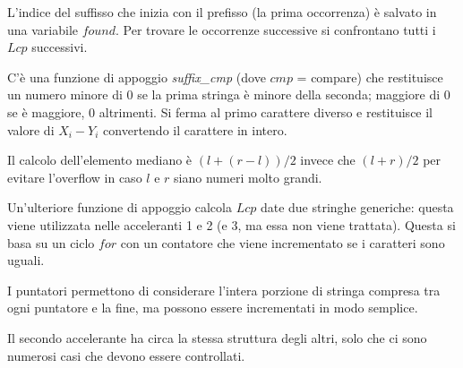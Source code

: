 L'indice del suffisso che inizia con il prefisso (la prima occorrenza) è salvato in una variabile $found$. Per trovare le occorrenze successive si confrontano tutti i $Lcp$ successivi. 

C'è una funzione di appoggio \textit{suffix\_cmp} (dove $cmp$ = compare) che restituisce un numero minore di 0 se la prima stringa è minore della seconda; maggiore di 0 se è maggiore, 0 altrimenti. Si ferma al primo carattere diverso e restituisce il valore di $X_i - Y_i$ convertendo il carattere in intero.

Il calcolo dell'elemento mediano è $(l + (r - l))/2$ invece che $(l + r)/2$ per evitare l'overflow in caso $l$ e $r$ siano numeri molto grandi. 

Un'ulteriore funzione di appoggio calcola $Lcp$ date due stringhe generiche: questa viene utilizzata nelle acceleranti 1 e 2 (e 3, ma essa non viene trattata). Questa si basa su un ciclo $for$ con un contatore che viene incrementato se i caratteri sono uguali.

I puntatori permettono di considerare l'intera porzione di stringa compresa tra ogni puntatore e la fine, ma possono essere incrementati in modo semplice. 

Il secondo accelerante ha circa la stessa struttura degli altri, solo che ci sono numerosi casi che devono essere controllati. 




